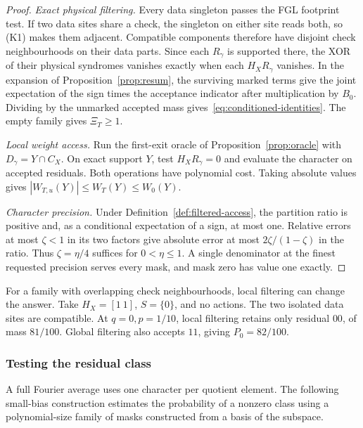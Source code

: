 \documentclass[10pt,twocolumn]{article}
\theoremstyle{definition}
\begin{document}
\begin{proof}
\emph{Exact physical filtering.} Every data singleton passes the FGL
footprint test. If two data sites share a check, the singleton on either
site reads both, so (K1) makes them adjacent. Compatible components
therefore have disjoint check neighbourhoods on their data parts.
Since each $R_\gamma$ is supported there, the XOR of their physical
syndromes vanishes exactly when each $H_XR_\gamma$ vanishes.
In the expansion of Proposition~\ref{prop:resum}, the surviving
marked terms give the joint expectation of the sign times the
acceptance indicator after multiplication by $B_0$. Dividing by
the unmarked accepted mass gives~\eqref{eq:conditioned-identities}.
The empty family gives $\Xi_T\ge1$.

\emph{Local weight access.} Run the first-exit oracle of
Proposition~\ref{prop:oracle} with $D_\gamma=Y\cap C_X$. On exact
support $Y$, test $H_XR_\gamma=0$ and evaluate the character on
accepted residuals. Both operations have polynomial cost. Taking
absolute values gives $|W_{T,u}(Y)|\le W_T(Y)\le W_0(Y)$.

\emph{Character precision.} Under Definition~\ref{def:filtered-access},
the partition ratio is positive and, as a conditional expectation
of a sign, at most one. Relative errors at most $\zeta<1$ in its two
factors give absolute error at most $2\zeta/(1-\zeta)$ in the ratio.
Thus $\zeta=\eta/4$ suffices for $0<\eta\le1$. A single denominator
at the finest requested precision serves every mask, and mask zero
has value one exactly.
\end{proof}

For a family with overlapping check neighbourhoods, local filtering
can change the answer. Take $H_X=[1\ 1]$, $S=\{0\}$, and no actions.
The two isolated data sites are compatible. At $q=0,p=1/10$, local
filtering retains only residual $00$, of mass $81/100$. Global filtering
also accepts $11$, giving $P_0=82/100$.

\subsubsection{Testing the residual class}\label{sec:transfer}

A full Fourier average uses one character per quotient element. The
following small-bias construction estimates the probability of a
nonzero class using a polynomial-size family of masks constructed
from a basis of the subspace.
\end{document}
